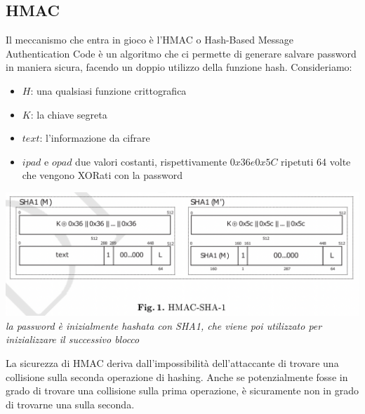 \documentclass[11pt, oneside]{article}   	%
\begin{document}
\subsection*{HMAC}
Il meccanismo che entra in gioco è l'HMAC o Hash-Based Message Authentication Code è un algoritmo che ci permette di generare salvare password in maniera sicura, facendo un doppio utilizzo della funzione hash.
Consideriamo:
\begin{itemize}
\item $H$: una qualsiasi funzione crittografica
\item $K$: la chiave segreta
\item $text$: l'informazione da cifrare
\item $ipad$ e $opad$ due valori costanti, rispettivamente $0x36 e 0x5C$ ripetuti 64 volte che vengono XORati con la password
\end{itemize}
\begin{center}
\includegraphics[scale= 0.5]{HMAC}\\
\emph{la password è inizialmente hashata con SHA1, che viene poi utilizzato per inizializzare il successivo blocco}
\end{center}
La sicurezza di HMAC deriva dall'impossibilità dell'attaccante di trovare una collisione sulla seconda operazione di hashing. Anche se potenzialmente fosse in grado di trovare una collisione sulla prima operazione, è sicuramente non in grado di trovarne una sulla seconda.
\end{document}
